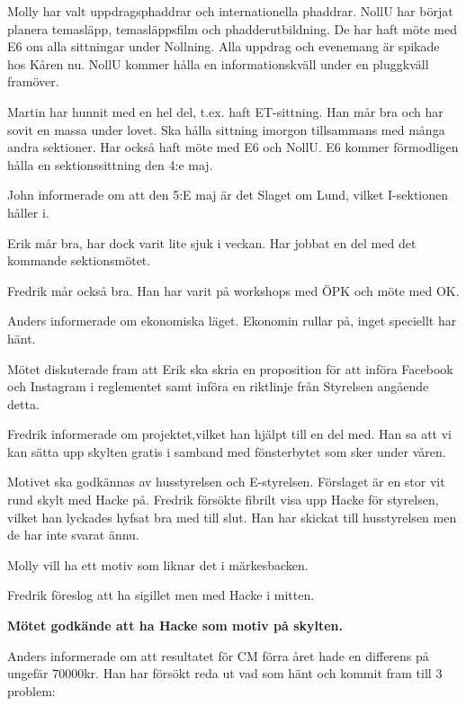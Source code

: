 \documentclass[10pt]{article}
\begin{document}
\begin{paragrafer}
\begin{paragrafer}
Molly har valt uppdragsphaddrar och internationella phaddrar. NollU har börjat planera temasläpp, temasläppsfilm och phadderutbildning. De har haft möte med E6 om alla sittningar under Nollning. Alla uppdrag och evenemang är spikade hos Kåren nu. NollU kommer hålla en informationskväll under en pluggkväll framöver.

Martin har hunnit med en hel del, t.ex. haft ET-sittning. Han mår bra och har sovit en massa under lovet. Ska hålla sittning imorgon tillsammans med många andra sektioner. Har också haft möte med E6 och NollU. E6 kommer förmodligen hålla en sektionssittning den 4:e maj.

John informerade om att den 5:E maj är det Slaget om Lund, vilket I-sektionen håller i.

Erik mår bra, har dock varit lite sjuk i veckan. Har jobbat en del med det kommande sektionsmötet.

Fredrik mår också bra. Han har varit på workshops med ÖPK och möte med OK.


Anders informerade om ekonomiska läget. Ekonomin rullar på, inget speciellt har hänt.

\end{paragrafer}

Mötet diskuterade fram att Erik ska skria en proposition för att införa Facebook och Instagram i reglementet samt införa en riktlinje från Styrelsen angående detta.

Fredrik informerade om projektet,vilket han hjälpt till en del med. Han sa att vi kan sätta upp skylten gratis i samband med fönsterbytet som sker under våren.

Motivet ska godkännas av husstyrelsen och E-styrelsen. Förslaget är en stor vit rund skylt med Hacke på. Fredrik försökte fibrilt visa upp Hacke för styrelsen, vilket han lyckades hyfsat bra med till slut. Han har skickat till husstyrelsen men de har inte svarat ännu.

Molly vill ha ett motiv som liknar det i märkesbacken.

Fredrik föreslog att ha sigillet men med Hacke i mitten.

\textbf{Mötet godkände att ha Hacke som motiv på skylten.}

Anders informerade om att resultatet för CM förra året hade en differens på ungefär 70000kr. Han har försökt reda ut vad som hänt och kommit fram till 3 problem:


\end{paragrafer}
\end{document}
